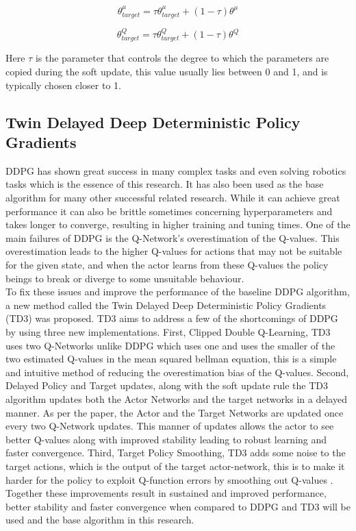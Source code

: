 \begin{equation}\label{eq:18}
    \theta^\mu_{target} = \tau \theta^\mu_{target} + (1 - \tau)\theta^\mu
\end{equation}

\begin{equation}\label{eq:19}
    \theta^Q_{target} = \tau \theta^Q_{target} + (1 - \tau)\theta^Q
\end{equation}

Here $\tau$ is the parameter that controls the degree to which the parameters are copied during the soft update, this value usually lies between 0 and 1, and is typically chosen closer to 1. \\

\subsection{Twin Delayed Deep Deterministic Policy Gradients}

DDPG has shown great success in many complex tasks and even solving robotics tasks which is the essence of this research. It has also been used as the base algorithm for many other successful related research. While it can achieve great performance it can also be brittle sometimes concerning hyperparameters and takes longer to converge, resulting in higher training and tuning times. One of the main failures of DDPG is the Q-Network's overestimation of the Q-values. This overestimation leads to the higher Q-values for actions that may not be suitable for the given state, and when the actor learns from these Q-values the policy beings to break or diverge to some unsuitable behaviour. \\

To fix these issues and improve the performance of the baseline DDPG algorithm, a new method called the Twin Delayed Deep Deterministic Policy Gradients (TD3) \cite{fujimoto2018addressing} was proposed. TD3 aims to address a few of the shortcomings of DDPG by using three new implementations. First, Clipped Double Q-Learning, TD3 uses two Q-Networks unlike DDPG which uses one and uses the smaller of the two estimated Q-values in the mean squared bellman equation, this is a simple and intuitive method of reducing the overestimation bias of the Q-values. Second, Delayed Policy and Target updates, along with the soft update rule the TD3 algorithm updates both the Actor Networks and the target networks in a delayed manner. As per the paper, the Actor and the Target Networks are updated once every two Q-Network updates. This manner of updates allows the actor to see better Q-values along with improved stability leading to robust learning and faster convergence. Third, Target Policy Smoothing, TD3 adds some noise to the target actions, which is the output of the target actor-network, this is to make it harder for the policy to exploit Q-function errors by smoothing out Q-values \cite{fujimoto2018addressing}. Together these improvements result in sustained and improved performance, better stability and faster convergence when compared to DDPG and TD3 will be used and the base algorithm in this research. \\

